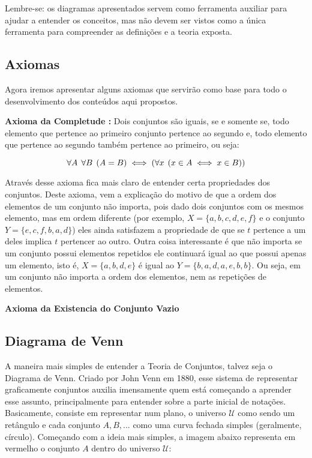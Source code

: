     Lembre-se: os diagramas apresentados servem como ferramenta auxiliar para ajudar a entender os conceitos, mas não devem ser vistos como a única ferramenta para compreender as definições e  a teoria exposta.
    
    \subsection{Axiomas}
    
    Agora iremos apresentar alguns axiomas que servirão como base para todo o desenvolvimento dos conteúdos aqui propostos.
    
    \textbf{Axioma da Completude :} Dois conjuntos são iguais, se e somente se, todo elemento que pertence ao primeiro conjunto pertence ao segundo e, todo elemento que pertence ao segundo também pertence ao primeiro, ou seja:
    
    \[\forall A \hspace{1.5mm} \forall B \hspace{1.5mm} (A=B) \iff (\forall x \hspace{1.5mm} (x \in A \iff x \in B))\]
    
    Através desse axioma fica mais claro de entender certa propriedades dos conjuntos. Deste axioma, vem a explicação do motivo de que a ordem dos elementos de um conjunto não importa, pois dado dois conjuntos com os mesmos elemento, mas em ordem diferente (por exemplo, $X=\{a,b,c,d,e,f\}$ e o conjunto $Y=\{e,c,f,b,a,d\}$) eles ainda satisfazem a propriedade de que se $t$ pertence a um deles implica $t$ pertencer ao outro. Outra coisa interessante é que não importa se um conjunto possui elementos repetidos ele continuará igual ao que possui apenas um elemento, isto é, $X=\{a,b,d,e\}$ é igual ao $Y=\{b,a,d,a,e,b,b\}$. Ou seja, em um conjunto não importa a ordem dos elementos, nem as repetições de elementos.
    
    \textbf{Axioma da Existencia do Conjunto Vazio}

    \subsection{Diagrama de Venn}
    A maneira mais simples de entender a Teoria de Conjuntos, talvez seja o Diagrama de Venn. Criado por John Venn em 1880, esse sistema de representar graficamente conjuntos auxilia imensamente quem está começando a aprender esse assunto, principalmente para entender sobre a parte inicial de notações. Basicamente, consiste em representar num plano, o universo $\mathcal U$ como sendo um retângulo e cada conjunto $A,B,...$ como uma curva fechada simples (geralmente, círculo). Começando com a ideia mais simples, a imagem abaixo representa em vermelho o conjunto $A$ dentro do universo $\mathcal U$:
    
